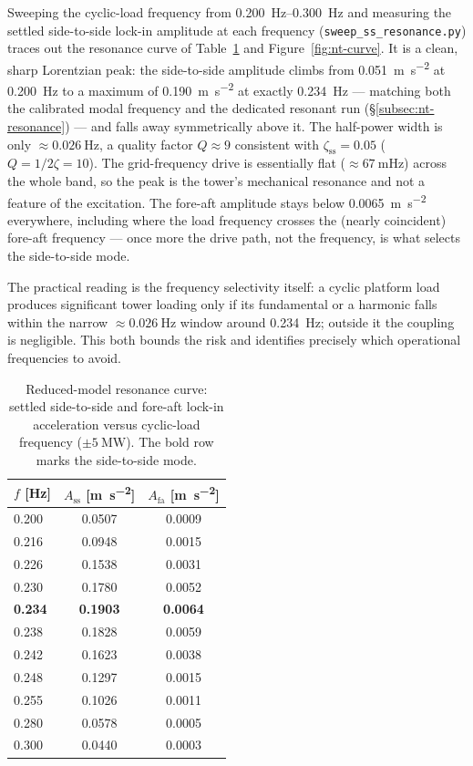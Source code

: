 Sweeping the cyclic-load frequency from \SIrange{0.200}{0.300}{\hertz} and
measuring the settled side-to-side lock-in amplitude at each frequency
(\texttt{sweep\_ss\_resonance.py}) traces out the resonance curve of
Table~\ref{tab:nt-curve} and Figure~\ref{fig:nt-curve}. It is a clean, sharp
Lorentzian peak: the side-to-side amplitude climbs from
\SI{0.051}{\metre\per\second\squared} at \SI{0.200}{\hertz} to a maximum of
\SI{0.190}{\metre\per\second\squared} at exactly \SI{0.234}{\hertz} --- matching
both the calibrated modal frequency and the dedicated resonant run
(\S\ref{subsec:nt-resonance}) --- and falls away symmetrically above it. The
half-power width is only \(\approx\SI{0.026}{\hertz}\), a quality factor
\(Q\approx 9\) consistent with \(\zeta_{\mathrm{ss}}=\num{0.05}\)
(\(Q=1/2\zeta=10\)). The grid-frequency drive is essentially flat
(\(\approx\SI{67}{\milli\hertz}\)) across the whole band, so the peak is the
tower's mechanical resonance and not a feature of the excitation. The fore-aft
amplitude stays below \SI{0.0065}{\metre\per\second\squared} everywhere,
including where the load frequency crosses the (nearly coincident) fore-aft
frequency --- once more the drive path, not the frequency, is what selects the
side-to-side mode.

The practical reading is the frequency selectivity itself: a cyclic platform load
produces significant tower loading only if its fundamental or a harmonic falls
within the narrow \(\approx\SI{0.026}{\hertz}\) window around
\SI{0.234}{\hertz}; outside it the coupling is negligible. This both bounds the
risk and identifies precisely which operational frequencies to avoid.

\begin{table}[t]
  \centering
  \caption{Reduced-model resonance curve: settled side-to-side and fore-aft
  lock-in acceleration versus cyclic-load frequency (\(\pm\SI{5}{\mega\watt}\)).
  The bold row marks the side-to-side mode.}
  \label{tab:nt-curve}
  \begin{tabular}{lcc}
    \toprule
    \(f\) [\si{\hertz}] &
      \(A_{\mathrm{ss}}\) [\si{\metre\per\second\squared}] &
      \(A_{\mathrm{fa}}\) [\si{\metre\per\second\squared}] \\
    \midrule
    0.200          & 0.0507 & 0.0009 \\
    0.216          & 0.0948 & 0.0015 \\
    0.226          & 0.1538 & 0.0031 \\
    0.230          & 0.1780 & 0.0052 \\
    \textbf{0.234} & \textbf{0.1903} & \textbf{0.0064} \\
    0.238          & 0.1828 & 0.0059 \\
    0.242          & 0.1623 & 0.0038 \\
    0.248          & 0.1297 & 0.0015 \\
    0.255          & 0.1026 & 0.0011 \\
    0.280          & 0.0578 & 0.0005 \\
    0.300          & 0.0440 & 0.0003 \\
    \bottomrule
  \end{tabular}
\end{table}

